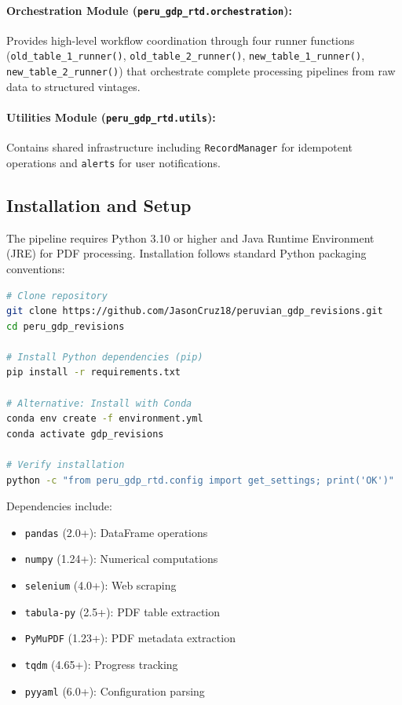 \documentclass[a4paper, fleqn, 11pt]{article}
\newcommand{\pymodule}[1]{\texttt{#1}}
\newcommand{\pyfunction}[1]{\texttt{#1()}}
\begin{document}
\paragraph{Orchestration Module (\pymodule{peru\_gdp\_rtd.orchestration}):} Provides high-level workflow coordination through four runner functions (\pyfunction{old\_table\_1\_runner}, \pyfunction{old\_table\_2\_runner}, \pyfunction{new\_table\_1\_runner}, \pyfunction{new\_table\_2\_runner}) that orchestrate complete processing pipelines from raw data to structured vintages.

\paragraph{Utilities Module (\pymodule{peru\_gdp\_rtd.utils}):} Contains shared infrastructure including \pymodule{RecordManager} for idempotent operations and \pymodule{alerts} for user notifications.

\subsection{Installation and Setup}

The pipeline requires Python 3.10 or higher and Java Runtime Environment (JRE) for PDF processing. Installation follows standard Python packaging conventions:

\begin{lstlisting}[language=bash, caption={Installation procedure}]
# Clone repository
git clone https://github.com/JasonCruz18/peruvian_gdp_revisions.git
cd peru_gdp_revisions

# Install Python dependencies (pip)
pip install -r requirements.txt

# Alternative: Install with Conda
conda env create -f environment.yml
conda activate gdp_revisions

# Verify installation
python -c "from peru_gdp_rtd.config import get_settings; print('OK')"
\end{lstlisting}

Dependencies include:
\begin{itemize}
    \item \texttt{pandas} (2.0+): DataFrame operations
    \item \texttt{numpy} (1.24+): Numerical computations
    \item \texttt{selenium} (4.0+): Web scraping
    \item \texttt{tabula-py} (2.5+): PDF table extraction
    \item \texttt{PyMuPDF} (1.23+): PDF metadata extraction
    \item \texttt{tqdm} (4.65+): Progress tracking
    \item \texttt{pyyaml} (6.0+): Configuration parsing
\end{itemize}
\end{document}
